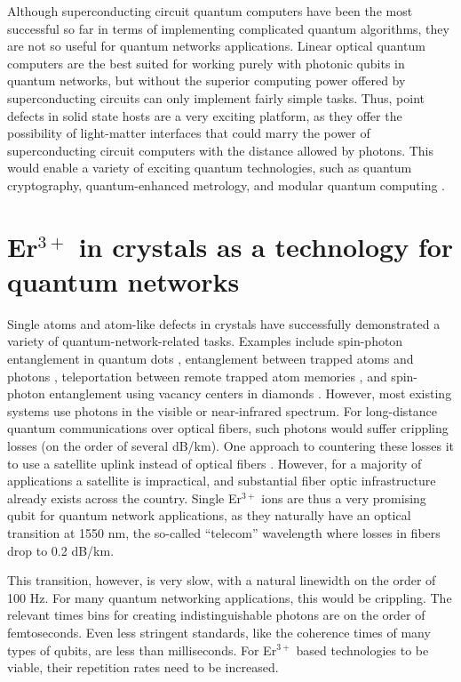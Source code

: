 \documentclass[12pt]{puthesis}
\newcommand{\erbium}[1][ ]{Er$^{3+}$#1}
\begin{document}
Although superconducting circuit quantum computers have been the most successful so far in terms of implementing complicated quantum algorithms, they are not so useful for quantum networks applications. Linear optical quantum computers are the best suited for working purely with photonic qubits in quantum networks, but without the superior computing power offered by superconducting circuits can only implement fairly simple tasks. Thus, point defects in solid state hosts are a very exciting platform, as they offer the possibility of light-matter interfaces that could marry the power of superconducting circuit computers with the distance allowed by photons. This would enable a variety of exciting quantum technologies, such as quantum cryptography, quantum-enhanced metrology, and modular quantum computing \cite{Monroe2014}.

\section{\erbium in crystals as a technology for quantum networks }

Single atoms and atom-like defects in crystals have successfully demonstrated a variety of quantum-network-related tasks. Examples include spin-photon entanglement in quantum dots \cite{Greve2012}, entanglement between trapped atoms and photons \cite{Blinov2004}, teleportation between remote trapped atom memories \cite{Nolleke2013}, and spin-photon entanglement using vacancy centers in diamonds \cite{Togan2010}. However, most existing systems use photons in the visible or near-infrared spectrum. For long-distance quantum communications over optical fibers, such photons would suffer crippling losses (on the order of several dB/km). One approach to countering these losses it to use a satellite uplink instead of optical fibers \cite{Yin2017}. However, for a majority of applications a satellite is impractical, and substantial fiber optic infrastructure already exists across the country. Single \erbium ions are thus a very promising qubit for quantum network applications, as they naturally have an optical transition at 1550 nm, the so-called ``telecom'' wavelength where losses in fibers drop to 0.2 dB/km.

This transition, however, is very slow, with a natural linewidth on the order of 100 Hz. For many quantum networking applications, this would be crippling. The relevant times bins for creating indistinguishable photons are on the order of femtoseconds. Even less stringent standards, like the coherence times of many types of qubits, are less than milliseconds. For \erbium based technologies to be viable, their repetition rates need to be increased. 
\end{document}
